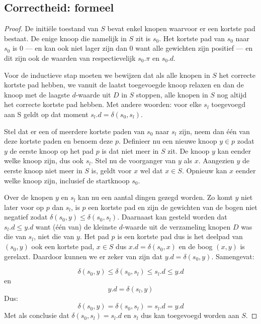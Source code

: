\documentclass[conference]{IEEEtran}
\theoremstyle{definition}
\theoremstyle{remark}
\begin{document}
\subsection{Correctheid: formeel}
\begin{proof}
De initiële toestand van $S$ bevat enkel knopen waarvoor er een kortste pad bestaat. De enige knoop die namelijk in $S$ zit is $s_0$. Het kortste pad van $s_0$ naar $s_0$ is $0$ --- en kan ook niet lager zijn dan $0$ want alle gewichten zijn positief --- en dit zijn ook de waarden van respectievelijk $s_0.\pi$ en $s_0.d$.

Voor de inductieve stap moeten we bewijzen dat als alle knopen in $S$ het correcte kortste pad hebben, we vanuit de laatst toegevoegde knoop relaxen en dan de knoop met de laagste $d$-waarde uit $D$ in $S$ stoppen, alle knopen in $S$ nog altijd het correcte kortste pad hebben. Met andere woorden: voor elke $s_l$ toegevoegd aan S geldt op dat moment $s_l.d = \delta(s_0, s_l)$.

Stel dat er een of meerdere kortste paden van $s_0$ naar $s_l$ zijn, neem dan één van deze kortste paden en benoem deze $p$. Definieer nu een nieuwe knoop $y \in p$ zodat $y$ de eerste knoop op het pad $p$ is dat niet meer in $S$ zit. De knoop $y$ kan eender welke knoop zijn, dus ook $s_l$. Stel nu de voorganger van $y$ als $x$. Aangezien $y$ de eerste knoop niet meer in $S$ is, geldt voor $x$ wel dat $x \in S$. Opnieuw kan $x$ eender welke knoop zijn, inclusief de startknoop $s_0$.

Over de knopen $y$ en $s_l$ kan nu een aantal dingen gezegd worden. Zo komt $y$ niet later voor op $p$ dan $s_l$, is $p$ een kortste pad en zijn de gewichten van de bogen niet negatief zodat $\delta(s_0, y) \leq \delta(s_0, s_l)$. Daarnaast kan gesteld worden dat $s_l.d \leq y.d$ want (één van) de kleinste $d$-waarde uit de verzameling knopen $D$ was die van $s_l$, niet die van $y$. Het pad $p$ is een kortste pad dus is het deelpad van $(s_0, y)$ ook een kortste pad, $x \in S$ dus $x.d = \delta(s_0, x)$ en de boog $(x, y)$ is gerelaxt. Daardoor kunnen we er zeker van zijn dat $y.d = \delta(s_0, y)$. Samengevat:

\[\delta(s_0, y) \leq \delta(s_0, s_l) \leq s_l.d \leq y.d\]
en
\[y.d = \delta(s_l, y)\]
Dus:
\[\delta(s_0, y) = \delta(s_0, s_l) = s_l.d = y.d\]
Met als conclusie dat $\delta(s_0, s_l) = s_l.d$ en $s_l$ dus kan toegevoegd worden aan $S$.
\end{proof}
\end{document}

